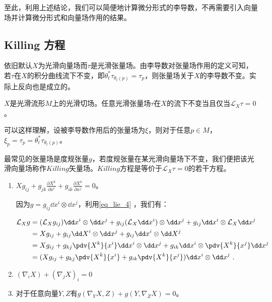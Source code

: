至此，利用上述结论，我们可以简便地计算微分形式的李导数，不再需要引入向量场并计算微分形式和向量场作用的结果。
\subsection{Killing 方程}
依旧默认$X$为光滑向量场而$\tau$是光滑张量场。由李导数对张量场作用的定义可知，若$\tau$在$X$的积分曲线流下不变，即$\theta_t^*\tau_{\theta_t(p)}=\tau_p$，则张量场关于$X$的李导数不变。实际上反向也是成立的。

\begin{theorem}{}
$X$是光滑流形$M$上的光滑切场。任意光滑张量场$\tau$在$X$的流下不变当且仅当$\mathcal L_X\tau=0$。
\end{theorem}
可以这样理解，设被李导数作用后的张量场为$\xi$，则对于任意$p\in M$，$\xi_p=\tau_p=\theta_t^*\tau_{\theta_t(p)}$。

最常见的张量场是度规张量$g$，若度规张量在某光滑向量场下不变，我们便把该光滑向量场称作$Killing$矢量场。$Killing$方程是等价于$\mathcal L_X\tau=0$的若干方程。
\begin{enumerate}
\item $Xg_{ij}+g_{jk}\frac{\partial X^k}{\partial x^i}+g_{ik}\frac{\partial X^k}{\partial x^j}=0$。

因为$g=g_{ij}\dd x^i\otimes\dd x^j$，利用\autoref{eq_lie_4} ，我们有：

\begin{equation}
\begin{aligned}
\mathcal L_X g&=(\mathcal L_Xg_{ij})\dd x^i\otimes \dd x^j+
g_{ij}(\mathcal L_X\dd x^i)\otimes\dd x^j+g_{ij}\dd x^i\otimes \mathcal L_X\dd x^j\\
&= Xg_{ij}+g_{ij}\dd X^i\otimes \dd x^j+g_{ij}\dd x^i\otimes \dd X^j\\
&=Xg_{ij}+g_{kj}\pdv{X^k}{x^i}\dd x^i\otimes\dd x^j+g_{ik}\dd x^i\otimes \pdv{X^k}{x^j}\dd x^j\\
&=(Xg_{ij}+g_{kj}\pdv{X^k}{x^i}+g_{ik}\pdv{X^k}{x^j})\dd x^i\otimes \dd x^j~.
\end{aligned}
\end{equation}

\item $(\nabla_iX)+(\nabla_j X)_i=0$
\item 对于任意向量$Y,Z$有$g\left(\nabla_YX,Z\right)+g\left(Y,\nabla_ZX\right)=0$。
\end{enumerate}